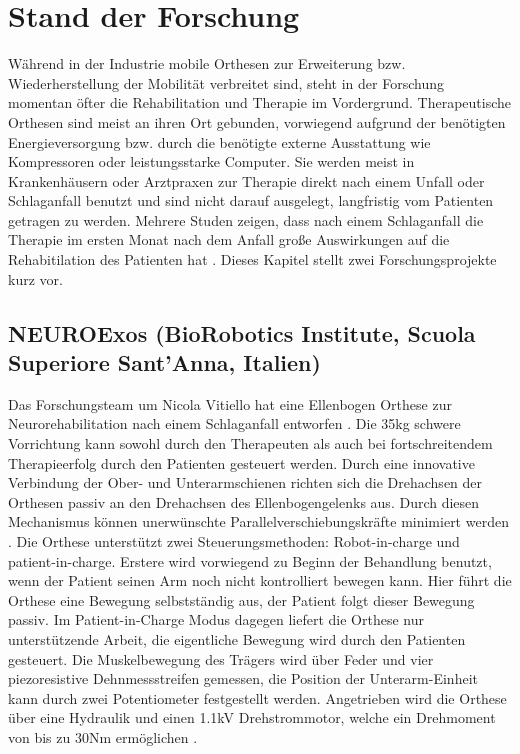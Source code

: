 \chapter{Stand der Forschung}
Während in der Industrie mobile Orthesen zur Erweiterung bzw. Wiederherstellung der Mobilität verbreitet sind, steht in der Forschung momentan öfter die Rehabilitation und Therapie im Vordergrund. Therapeutische Orthesen sind meist an ihren Ort gebunden, vorwiegend aufgrund der benötigten Energieversorgung bzw. durch die benötigte externe Ausstattung wie Kompressoren oder leistungsstarke Computer. Sie werden meist in Krankenhäusern oder Arztpraxen zur Therapie direkt nach einem Unfall oder Schlaganfall benutzt und sind nicht darauf ausgelegt, langfristig vom Patienten getragen zu werden. Mehrere Studen zeigen, dass nach einem Schlaganfall die Therapie im ersten Monat nach dem Anfall große Auswirkungen auf die Rehabitilation des Patienten hat \citep{Langhorne.2011, Prange.2006}. Dieses Kapitel stellt zwei Forschungsprojekte kurz vor. \\

\section{NEUROExos (BioRobotics Institute, Scuola Superiore Sant’Anna, Italien)}
Das Forschungsteam um Nicola Vitiello hat eine Ellenbogen Orthese zur Neurorehabilitation nach einem Schlaganfall entworfen \citep{Cempini.2013}. Die 35kg schwere Vorrichtung kann sowohl durch den Therapeuten als auch bei fortschreitendem Therapieerfolg durch den Patienten gesteuert werden. Durch eine innovative Verbindung der Ober- und Unterarmschienen richten sich die Drehachsen der Orthesen passiv an den Drehachsen des Ellenbogengelenks aus. Durch diesen Mechanismus können unerwünschte Parallelverschiebungskräfte minimiert werden \citep{Vitiello.2013}. Die Orthese unterstützt zwei Steuerungsmethoden: Robot-in-charge und patient-in-charge. Erstere wird vorwiegend zu Beginn der Behandlung benutzt, wenn der Patient seinen Arm noch nicht kontrolliert bewegen kann. Hier führt die Orthese eine Bewegung selbstständig aus, der Patient folgt dieser Bewegung passiv. Im Patient-in-Charge Modus dagegen liefert die Orthese nur unterstützende Arbeit, die eigentliche Bewegung wird durch den Patienten gesteuert. Die Muskelbewegung des Trägers wird über Feder und vier piezoresistive Dehnmessstreifen gemessen, die Position der Unterarm-Einheit kann durch zwei Potentiometer festgestellt werden.  Angetrieben wird die Orthese über eine Hydraulik und einen 1.1kV Drehstrommotor, welche ein Drehmoment von bis zu 30Nm ermöglichen \citep{Lenzi.2011}.\\
 
